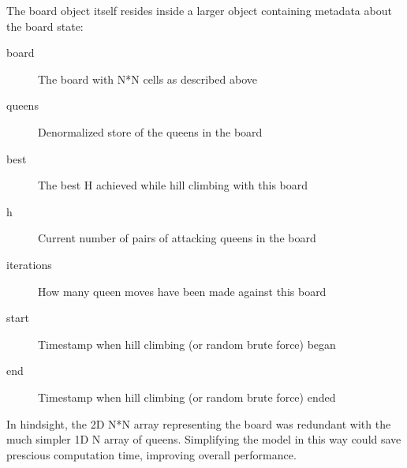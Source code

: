 The board object itself resides inside a larger object containing metadata about the board state:

\begin{description}
\item[board] The board with N*N cells as described above
\item[queens] Denormalized store of the queens in the board
\item[best] The best H achieved while hill climbing with this board
\item[h] Current number of pairs of attacking queens in the board
\item[iterations] How many queen moves have been made against this board
\item[start] Timestamp when hill climbing (or random brute force)  began
\item[end] Timestamp when hill climbing (or random brute force) ended
\end{description}

In hindsight, the 2D N*N array representing the board was redundant with the much simpler 1D N array of queens.
Simplifying the model in this way could save prescious computation time, improving overall performance.